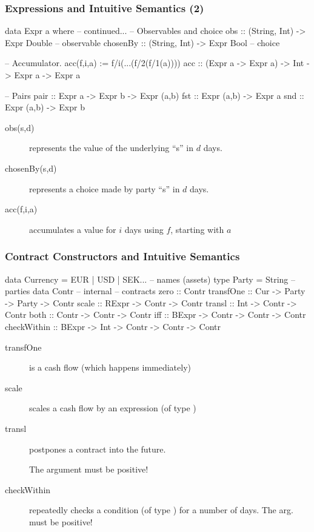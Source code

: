 \documentclass[xcolor=dvipsnames,11pt]{beamer}
\renewcommand{\emph}[1]{\textcolor{structure!90}{#1}}
\begin{document}
\begin{frame}[fragile,t]
    \frametitle{Expressions and Intuitive Semantics (2)}

\begin{hscode}
data Expr a where
    -- continued...
    -- Observables and choice
    obs :: (String, Int) -> Expr Double    -- observable
    chosenBy :: (String, Int) -> Expr Bool -- choice

    -- Accumulator. acc(f,i,a) := f/i(...(f/2(f/1(a))))
    acc :: (Expr a -> Expr a) -> Int -> Expr a -> Expr a

    -- Pairs
    pair :: Expr a -> Expr b -> Expr (a,b)
    fst :: Expr (a,b) -> Expr a
    snd :: Expr (a,b) -> Expr b
\end{hscode}

\begin{description}
\item[obs(s,d)] represents the value of the underlying ``s'' in $d$ days.
\item[chosenBy(s,d)] represents a choice made by party ``s'' in $d$ days.
\item[acc(f,i,a)] accumulates a value for $i$ days using $f$, starting with $a$
\end{description}

\end{frame}

\begin{frame}[fragile,t]
    \frametitle{Contract Constructors and Intuitive Semantics}

\begin{hscode}
  data Currency = EUR | USD | SEK... -- names (assets)
  type Party = String       -- parties
  data Contr -- internal    -- contracts
  zero        :: Contr             
  transfOne   :: Cur -> Party -> Party -> Contr
  scale       :: RExpr -> Contr -> Contr
  transl      :: Int -> Contr -> Contr
  both        :: Contr -> Contr -> Contr
  iff         :: BExpr -> Contr -> Contr -> Contr
  checkWithin :: BExpr -> Int -> Contr -> Contr -> Contr
\end{hscode}

\begin{description}
\item[transfOne] is a cash flow (which happens immediately)
\item[scale] scales a cash flow by an expression (of type )
\item[transl] postpones a contract into the \emph{future}.

    The  argument must be positive!

\item[checkWithin] repeatedly checks a condition (of type ) for a number of days.
    The  arg. must be positive!
\end{description}
\end{frame}
\end{document}
